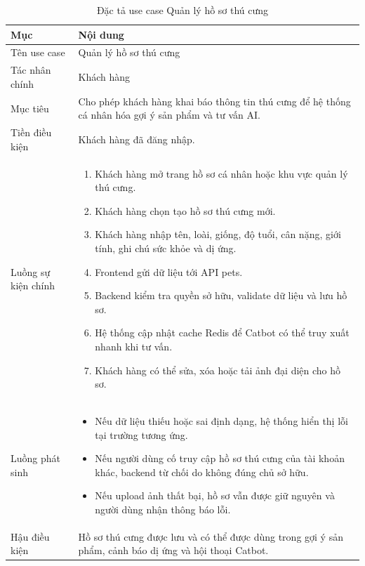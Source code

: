 \documentclass[../DoAn.tex]{subfiles}
\begin{document}
{\normalsize
\setlength{\LTleft}{\fill}
\setlength{\LTright}{\fill}
\setlength{\tabcolsep}{5pt}
\renewcommand{\arraystretch}{1.25}
\begin{longtable}{|p{3.2cm}|p{10.4cm}|}
\caption{Đặc tả use case Quản lý hồ sơ thú cưng}
\label{table:2.8}\\
\hline
\textbf{Mục} & \textbf{Nội dung} \\ \hline
Tên use case & Quản lý hồ sơ thú cưng \\ \hline
Tác nhân chính & Khách hàng \\ \hline
Mục tiêu & Cho phép khách hàng khai báo thông tin thú cưng để hệ thống cá nhân hóa gợi ý sản phẩm và tư vấn AI. \\ \hline
Tiền điều kiện & Khách hàng đã đăng nhập. \\ \hline
Luồng sự kiện chính &
\begin{minipage}[t]{10.1cm}
\begin{enumerate}[leftmargin=*,topsep=0pt,itemsep=0pt]
    \item Khách hàng mở trang hồ sơ cá nhân hoặc khu vực quản lý thú cưng.
    \item Khách hàng chọn tạo hồ sơ thú cưng mới.
    \item Khách hàng nhập tên, loài, giống, độ tuổi, cân nặng, giới tính, ghi chú sức khỏe và dị ứng.
    \item Frontend gửi dữ liệu tới API pets.
    \item Backend kiểm tra quyền sở hữu, validate dữ liệu và lưu hồ sơ.
    \item Hệ thống cập nhật cache Redis để Catbot có thể truy xuất nhanh khi tư vấn.
    \item Khách hàng có thể sửa, xóa hoặc tải ảnh đại diện cho hồ sơ.
\end{enumerate}
\end{minipage} \\ \hline
Luồng phát sinh &
\begin{minipage}[t]{10.1cm}
\begin{itemize}[leftmargin=*,topsep=0pt,itemsep=0pt]
    \item Nếu dữ liệu thiếu hoặc sai định dạng, hệ thống hiển thị lỗi tại trường tương ứng.
    \item Nếu người dùng cố truy cập hồ sơ thú cưng của tài khoản khác, backend từ chối do không đúng chủ sở hữu.
    \item Nếu upload ảnh thất bại, hồ sơ vẫn được giữ nguyên và người dùng nhận thông báo lỗi.
\end{itemize}
\end{minipage} \\ \hline
Hậu điều kiện & Hồ sơ thú cưng được lưu và có thể được dùng trong gợi ý sản phẩm, cảnh báo dị ứng và hội thoại Catbot. \\ \hline
\end{longtable}
}
\end{document}
